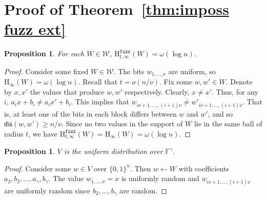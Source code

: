 \documentclass[11pt]{article}
\newcommand{\thref}[1]{\mbox{Theorem~\ref{#1}}}
\newcommand{\zo}{\ensuremath{\{0, 1\}}}
\newcommand{\dis}{\ensuremath{\mathsf{dis}}}
\newcommand{\Hoo}{\mathrm{H}_\infty}
\newcommand{\Hfuzz}{\mathrm{H}^{\mathtt{fuzz}}_{t,\infty}}
\newtheorem{proposition}[theorem]{Proposition}
\begin{document}
\section{Proof of \thref{thm:imposs fuzz ext}}
\label{sec:fuzz ext proof}
\begin{proposition} 
\label{prop:dist fuzzy ent fuzz}
For each $W\in\mathcal{W}$, $\Hfuzz(W) = \omega(\log n)$.
\end{proposition}
\begin{proof}
Consider some fixed $W\in\mathcal{W}$.  The bits $w_{1,..., \nu}$ are uniform, so $\Hoo(W) =\omega(\log n)$.  Recall that $t=o (n/\nu)$. 
Fix some $w, w'\in W$.  Denote by $x, x'$ the values that produce $w, w'$ respectively.  Clearly, $x\neq x'$.  Thus, for any $i$, $a_i x + b_i \neq a_i x' + b_i$.  This implies that $w_{i\nu+1,...., (i+1)\nu} \neq w'_{i\nu+1,..., (i+1)\nu}$. That is, at least one of the bits in each block differs between $w$ and $w'$, and so $\dis(w, w') \ge n/\nu$. Since no two values in the support of $W$ lie in the same ball of radius $t$, we have $\Hfuzz(W) = \Hoo(W)= \omega(\log n)$.
\end{proof}

\begin{proposition}\label{prop:dist uniform fuzz}
$V$ is the uniform distribution over $\mathbb{F}^\gamma$.
\end{proposition}
\begin{proof}
Consider some $w\in V$ over $\zo^n$.  Then $w\leftarrow W$ with coefficients $a_2, b_2, ..., a_\gamma , b_\gamma$.  The value $w_{1,...,\nu} =x $ is uniformly random and $w_{i\nu+1,...,(i+1)\nu}$ are uniformly random since $b_2,..., b_\gamma$ are random.
\end{proof}
\end{document}

